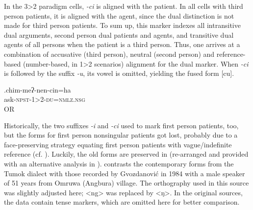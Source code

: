 In the 3>2 paradigm cells, \emph{-ci} is aligned with the patient. In all cells with third person patients, it is aligned with the agent, since the dual distinction is not made for third person patients. To sum up, this marker indexes all intransitive dual arguments,  second person dual patients and agents, and transitive dual agents of all persons when the patient is a third person. Thus, one arrives at a combination of accusative (third person), neutral (second person) and reference-based (number-based, in 1>2 scenarios) alignment for the dual marker. When \emph{-ci} is followed by the suffix \emph{-u}, its vowel is omitted, yielding the fused form [cu].

\exg.chim-meʔ-nen-cin=ha\\
ask{\scshape -npst-1>2-du=nmlz.nsg}\\
 OR\\

Historically, the two suffixes \emph{-i} and \emph{-ci} used to mark first person patients, too, but the forms for first person nonsingular patients got lost, probably due to a face-preserving strategy equating first person patients with vague/indefinite reference (cf. ). Luckily, the old forms are preserved in \citet{Gvozdanovic1987How} (re-arranged and provided with an alternative analysis in \citealt{Driem1994The-Yakkha}).  contrasts the contemporary forms from the Tumok dialect with those recorded by Gvozdanović in 1984 with a male speaker of 51 years from Omruwa (Angbura) village. The orthography used in this source was slightly adjusted here; <ng> was replaced  by <ŋ>.  In the original sources, the data contain tense markers, which are omitted here for better comparison. 


